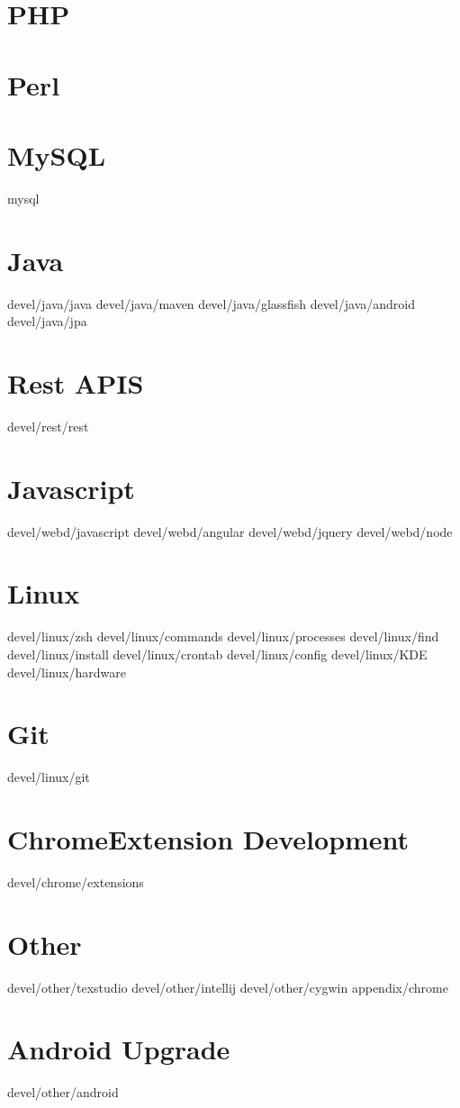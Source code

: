 \documentclass[a4paper]{report}
\begin{document}
\maketitle
\newpage
\tableofcontents
\newpage

%
\chapter{PHP}
\chapter{Perl}
\chapter{MySQL}
 {mysql}
\chapter{Java}
 {devel/java/java}
 {devel/java/maven}
 {devel/java/glassfish}
 {devel/java/android}
 {devel/java/jpa}
\chapter{Rest APIS}
 {devel/rest/rest}
\chapter{Javascript}
 {devel/webd/javascript}
 {devel/webd/angular}
 {devel/webd/jquery}
 {devel/webd/node}
\chapter{Linux}
 {devel/linux/zsh}
 {devel/linux/commands}
 {devel/linux/processes}
 {devel/linux/find}
 {devel/linux/install}
 {devel/linux/crontab}
 {devel/linux/config}
 {devel/linux/KDE}
 {devel/linux/hardware}
\chapter{Git}
 {devel/linux/git}
\chapter{ChromeExtension Development}
 {devel/chrome/extensions}
\chapter{Other}
 {devel/other/texstudio}
 {devel/other/intellij}
 {devel/other/cygwin}
\appendix 
 {appendix/chrome}
\chapter{Android Upgrade}
 {devel/other/android}
\end{document}
